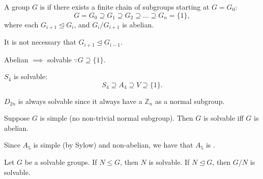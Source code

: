 \documentclass[notoc,notitlepage,nobib]{tufte-book}
\begin{document}
\begin{defn}\label{defn:solvable_groups}
  A group $G$ is  if there exists a finite chain of subgroups
  starting at $G = G_0$:
  \begin{equation*}
    G = G_0 \supseteq G_1 \supseteq G_2 \supseteq \hdots \supseteq G_n = \{1\},
  \end{equation*}
  where each $G_{i + 1} \trianglelefteq G_i$, and  $G_i / G_{i+1}$ is abelian.
\end{defn}

\begin{note}
  It is not necessary that $G_{i + 1} \trianglelefteq G_{i-1}$.
\end{note}

\begin{eg}
  Abelian $\implies$ solvable $\because G \supseteq \{1\}$.
\end{eg}

\begin{eg}
  $S_4$ is solvable:
  \begin{equation*}
    S_4 \supseteq A_4 \supseteq V \supseteq \{1\}.
  \end{equation*}
\end{eg}

\begin{eg}
  $D_{2n}$ is always solvable since it always have a $\mathbb{Z}_n$ as a normal
  subgroup.
\end{eg}

\begin{eg}
  Suppose $G$ is simple (no non-trivial normal subgroup). Then $G$ is solvable
  iff $G$ is abelian.
\end{eg}

\begin{eg}
  Since $A_5$ is simple (by Sylow) and non-abelian, we have that $A_5$ is
  .
\end{eg}

\begin{propo}\label{propo:subgroups_of_solvable_groups_are_solvable}
  Let $G$ be a solvable groups. If $N \leq G$, then $N$ is solvable. If $N
  \trianglelefteq G$, then $G / N$ is solvable.
\end{propo}
\end{document}
